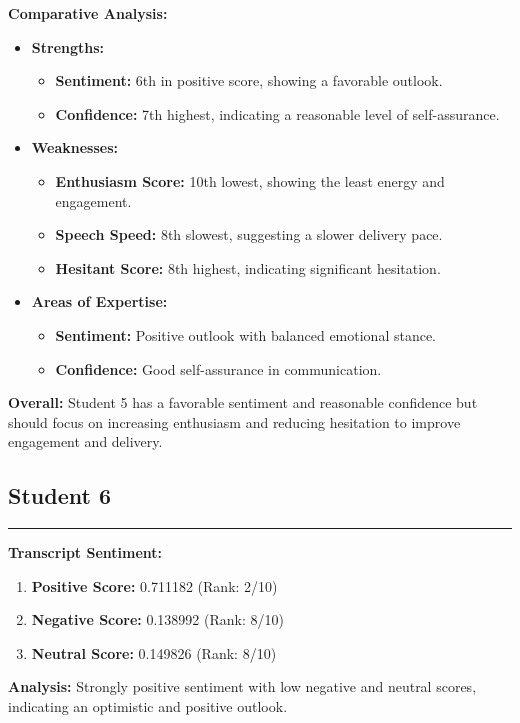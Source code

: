 \documentclass{article}
\begin{document}
\textbf{Comparative Analysis:}
\begin{itemize}
    \item \textbf{Strengths:}
    \begin{itemize}
        \item \textbf{Sentiment:} 6th in positive score, showing a favorable outlook.
        \item \textbf{Confidence:} 7th highest, indicating a reasonable level of self-assurance.
    \end{itemize}
    \item \textbf{Weaknesses:}
    \begin{itemize}
        \item \textbf{Enthusiasm Score:} 10th lowest, showing the least energy and engagement.
        \item \textbf{Speech Speed:} 8th slowest, suggesting a slower delivery pace.
        \item \textbf{Hesitant Score:} 8th highest, indicating significant hesitation.
    \end{itemize}
    \item \textbf{Areas of Expertise:}
    \begin{itemize}
        \item \textbf{Sentiment:} Positive outlook with balanced emotional stance.
        \item \textbf{Confidence:} Good self-assurance in communication.
    \end{itemize}
\end{itemize}

\textbf{Overall:} Student 5 has a favorable sentiment and reasonable confidence but should focus on increasing enthusiasm and reducing hesitation to improve engagement and delivery.

\subsection{Student 6}
\begin{center}
    \color{green}\rule{1\linewidth}{0.7mm}
\end{center}

\large{\textbf{Transcript Sentiment:}}
\begin{tcolorbox}[colback=green!5!white,colframe=green!75!black,title=Sentiment Breakdown]
    \begin{enumerate}
        \item \textbf{Positive Score:} \textcolor{green!70!black}{0.711182} (Rank: 2/10)
        \item \textbf{Negative Score:} \textcolor{red!70!black}{0.138992} (Rank: 8/10)
        \item \textbf{Neutral Score:} \textcolor{blue!70!black}{0.149826} (Rank: 8/10)
    \end{enumerate}
\end{tcolorbox}
    \textbf{Analysis:} Strongly positive sentiment with low negative and neutral scores, indicating an optimistic and positive outlook.
\end{document}
